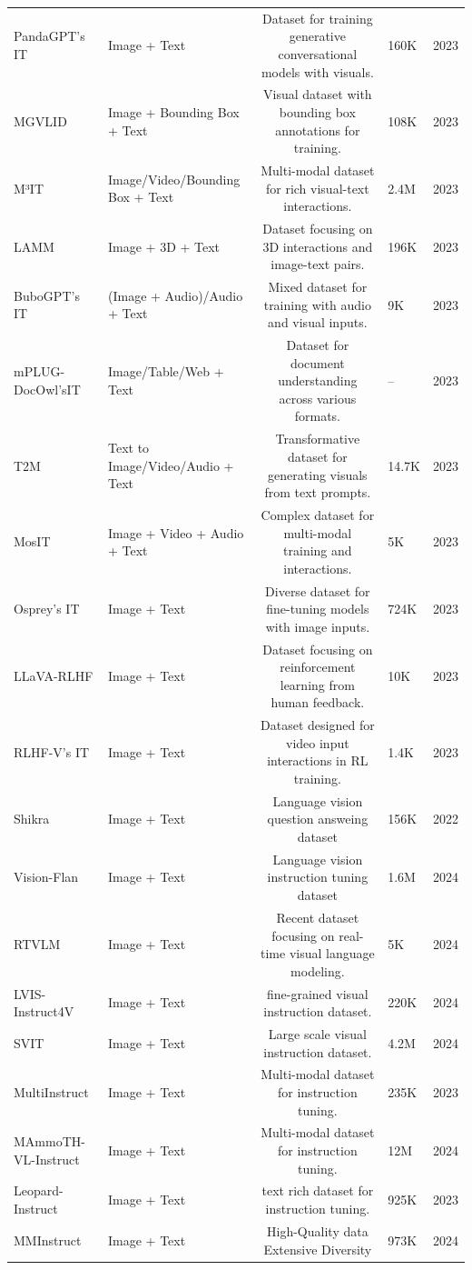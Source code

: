 \documentclass[runningheads]{llncs}
\begin{document}
\begin{table}[h]
{\begin{tabular}{l l c l r}
                PandaGPT's IT & Image + Text & Dataset for training generative conversational models with visuals. & 160K & 2023\\
                MGVLID & Image + Bounding Box + Text & Visual dataset with bounding box annotations for training. & 108K & 2023\\
                M³IT & Image/Video/Bounding Box + Text & Multi-modal dataset for rich visual-text interactions. & 2.4M & 2023\\
                LAMM & Image + 3D + Text & Dataset focusing on 3D interactions and image-text pairs. & 196K & 2023\\
                BuboGPT's IT & (Image + Audio)/Audio + Text & Mixed dataset for training with audio and visual inputs. & 9K & 2023\\
                mPLUG-DocOwl'sIT & Image/Table/Web + Text & Dataset for document understanding across various formats. & -- & 2023\\
                T2M & Text to Image/Video/Audio + Text & Transformative dataset for generating visuals from text prompts. & 14.7K & 2023\\
                MosIT & Image + Video + Audio + Text & Complex dataset for multi-modal training and interactions. & 5K & 2023\\
                Osprey's IT & Image + Text & Diverse dataset for fine-tuning models with image inputs. & 724K & 2023\\
                LLaVA-RLHF & Image + Text & Dataset focusing on reinforcement learning from human feedback. & 10K & 2023\\
                RLHF-V's IT & Image + Text & Dataset designed for video input interactions in RL training. & 1.4K & 2023\\
                Shikra & Image + Text & Language vision question answeing dataset & 156K & 2022\\
                Vision-Flan & Image + Text & Language vision instruction tuning dataset & 1.6M & 2024\\
                RTVLM & Image + Text & Recent dataset focusing on real-time visual language modeling. & 5K & 2024\\
                LVIS-Instruct4V & Image + Text & fine-grained visual instruction dataset. & 220K & 2024\\
                SVIT & Image + Text & Large scale visual instruction dataset. & 4.2M & 2024\\
                MultiInstruct & Image + Text & Multi-modal dataset for instruction tuning. & 235K & 2023\\
                MAmmoTH-VL-Instruct & Image + Text & Multi-modal dataset for instruction tuning. & 12M & 2024\\               
                Leopard-Instruct & Image + Text & text rich dataset for instruction tuning. & 925K & 2023\\
                MMInstruct & Image + Text & High-Quality data Extensive Diversity & 973K & 2024\\
    		

\end{tabular}}
\end{table}
\end{document}
